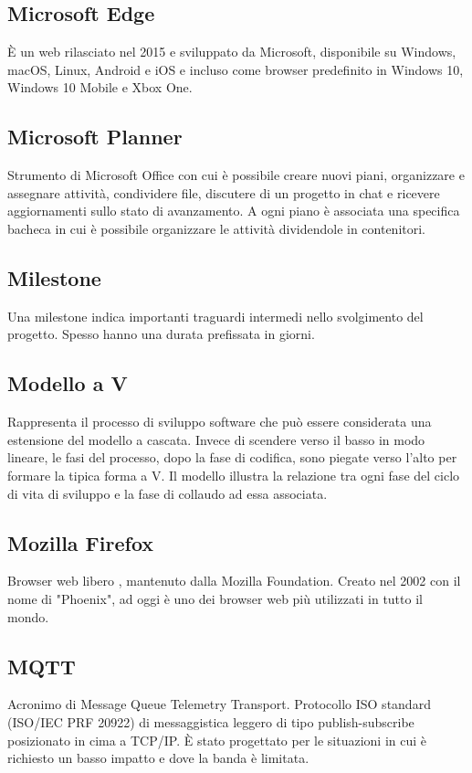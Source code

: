 \subsection*{Microsoft Edge}
È un  web rilasciato nel 2015 e sviluppato da Microsoft, disponibile su Windows, macOS, Linux, Android e iOS e incluso come browser predefinito in Windows 10, Windows 10 Mobile e Xbox One. 

\subsection*{Microsoft Planner}
Strumento di Microsoft Office con cui è possibile creare nuovi piani, organizzare e assegnare attività, condividere file, discutere di un progetto in chat e ricevere aggiornamenti sullo stato di avanzamento.
A ogni piano è associata una specifica bacheca in cui è possibile organizzare le attività dividendole in contenitori.

\subsection*{Milestone}
Una milestone indica importanti traguardi intermedi nello svolgimento del progetto. Spesso hanno una durata prefissata in giorni.

\subsection*{Modello a V}
Rappresenta il processo di sviluppo software che può essere considerata una estensione del modello a cascata. Invece di scendere verso il basso in modo lineare, le fasi del processo, dopo la fase di codifica, sono piegate verso l'alto per formare la tipica forma a V. Il modello illustra la relazione tra ogni fase del ciclo di vita di sviluppo e la fase di collaudo ad essa associata.

\subsection*{Mozilla Firefox}
Browser web libero , mantenuto dalla Mozilla Foundation. Creato nel 2002 con il nome di "Phoenix", ad oggi è uno dei browser web più utilizzati in tutto il mondo.

\subsection*{MQTT}
Acronimo di Message Queue Telemetry Transport. Protocollo ISO standard (ISO/IEC PRF 20922) di messaggistica leggero di tipo publish-subscribe posizionato in cima a TCP/IP. È stato progettato per le situazioni in cui è richiesto un basso impatto e dove la banda è limitata. 

